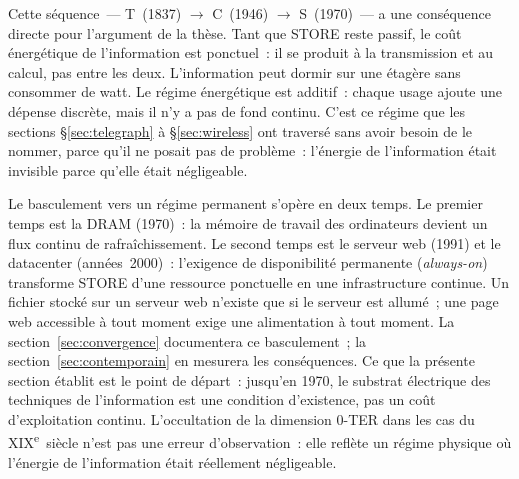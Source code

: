 %
Cette séquence~--- T~(1837) $\rightarrow$ C~(1946) $\rightarrow$ S~(1970)~--- a une conséquence directe pour l'argument de la thèse. Tant que STORE reste passif, le coût énergétique de l'information est ponctuel~: il se produit à la transmission et au calcul, pas entre les deux. L'information peut dormir sur une étagère sans consommer de watt. Le régime énergétique est additif~: chaque usage ajoute une dépense discrète, mais il n'y a pas de fond continu. C'est ce régime que les sections §\ref{sec:telegraph} à §\ref{sec:wireless} ont traversé sans avoir besoin de le nommer, parce qu'il ne posait pas de problème~: l'énergie de l'information était invisible parce qu'elle était négligeable.

%
Le basculement vers un régime permanent s'opère en deux temps. Le premier temps est la DRAM (1970)~: la mémoire de travail des ordinateurs devient un flux continu de rafraîchissement. Le second temps est le serveur web (1991) et le datacenter (années~2000)~: l'exigence de disponibilité permanente (\emph{always-on}) transforme STORE d'une ressource ponctuelle en une infrastructure continue. Un fichier stocké sur un serveur web n'existe que si le serveur est allumé~; une page web accessible à tout moment exige une alimentation à tout moment. La section~\ref{sec:convergence} documentera ce basculement~; la section~\ref{sec:contemporain} en mesurera les conséquences. Ce que la présente section établit est le point de départ~: jusqu'en 1970, le substrat électrique des techniques de l'information est une condition d'existence, pas un coût d'exploitation continu. L'occultation de la dimension 0-TER dans les cas du XIX\textsuperscript{e}~siècle n'est pas une erreur d'observation~: elle reflète un régime physique où l'énergie de l'information était réellement négligeable.



